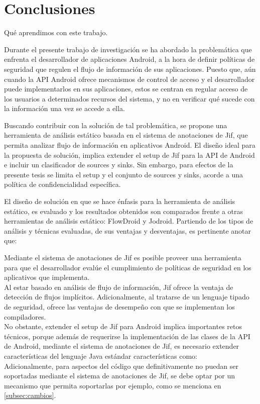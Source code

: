 \section{Conclusiones}
Qué aprendimos con este trabajo.\newline

Durante el presente trabajo de investigación se ha abordado la problemática que
enfrenta el desarrollador de aplicaciones Android, a la hora de definir políticas de
seguridad que regulen el flujo de información de sus aplicaciones. Puesto que,
aún cuando la API Android ofrece mecanismos de control de acceso y el
desarrollador puede implementarlos en sus aplicaciones, estos se centran en
regular acceso de los usuarios a determinados recursos del sistema, y no en
verificar qué sucede con la información una vez se accede a ella.

Buscando contribuir con la solución de tal problemática, se propone una
herramienta de análisis estático basada en el sistema de anotaciones de Jif, que
permita analizar flujo de información en aplicativos Android. El diseño ideal
para la propuesta de solución, implica extender el setup de Jif para la API de
Android e incluir un clasificador de sources y sinks. Sin embargo, para efectos
de la presente tesis se limita el setup y el conjunto de sources y sinks, acorde
a una política de confidencialidad específica.

El diseño de solución en que se hace énfasis para la herramienta de análisis
estático, es evaluado y los resultados obtenidos son comparados frente a otras
herramientas de análisis estático: FlowDroid y Jodroid. Partiendo de los tipos
de análisis y técnicas evaluadas, de sus ventajas y desventajas, es pertinente
anotar que:

Mediante el sistema de anotaciones de Jif es posible proveer una herramienta
para que el desarrollador evalúe el cumplimiento de políticas de seguridad en
los aplicativos que implementa.\\
Al estar basado en análisis de flujo de información, Jif ofrece la ventaja de
detección de flujos implícitos. Adicionalmente, al tratarse de un lenguaje
tipado de seguridad, ofrece las ventajas de desempeño con que se implementan los
compiladores.\\
No obstante, extender el setup de Jif para Android implica importantes retos
técnicos, porque además de requerirse la implementación de las clases de la API
de Android, mediante el sistema de anotaciones de Jif, es necesario extender
características del lenguaje Java estándar características como:\\
Adicionalmente, para aspectos del código que definitivamente no puedan ser
soportadas mediante el sistema de anotaciones de Jif, se debe optar por un
mecanismo que permita soportarlas por ejemplo, como se menciona en
\ref{subsec:cambios}.

